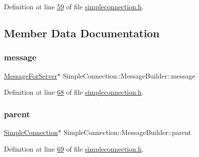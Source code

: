 Definition at line \hyperlink{a00008_source_l00059}{59} of file \hyperlink{a00008_source}{simpleconnection.\+h}.



\subsection{Member Data Documentation}
\mbox{\label{a00129_a7a57d1afb561f7fe4b813e611c3269a7}} 
\subsubsection{\texorpdfstring{message}{message}}
{\footnotesize\ttfamily \hyperlink{a00121}{Message\+For\+Server}$\ast$ Simple\+Connection\+::\+Message\+Builder\+::message\hspace{0.3cm}{\ttfamily [private]}}



Definition at line \hyperlink{a00008_source_l00068}{68} of file \hyperlink{a00008_source}{simpleconnection.\+h}.

\mbox{\label{a00129_a377817a44c6b088e5027365f8d6c8c8f}} 
\subsubsection{\texorpdfstring{parent}{parent}}
{\footnotesize\ttfamily \hyperlink{a00125}{Simple\+Connection}$\ast$ Simple\+Connection\+::\+Message\+Builder\+::parent\hspace{0.3cm}{\ttfamily [private]}}



Definition at line \hyperlink{a00008_source_l00069}{69} of file \hyperlink{a00008_source}{simpleconnection.\+h}.

